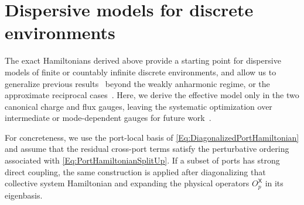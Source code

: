 \documentclass[prx,aps,twocolumn,article]{revtex4-2}
\newcommand{\msf}[1]{\mathsf{#1}}
\newcommand{\msX}{\msf{X}}
\begin{document}
\section{Dispersive models for discrete environments}
\label{Sec:SW-Models}
The exact Hamiltonians derived above provide a starting point for dispersive models of finite or countably infinite discrete environments, and allow us to generalize previous results~\cite{Solgun:2019,Labarca:2024} beyond the weakly anharmonic regime, or the approximate reciprocal cases~\cite{Khan:2024}. Here, we derive the effective model only in the two canonical charge and flux
gauges, leaving the systematic optimization over intermediate or mode-dependent gauges for future work~\cite{Roth:2019,Mehta:2022,Arwas:2023}.

For concreteness, we use the port-local basis of \cref{Eq:DiagonalizedPortHamiltonian} and assume that the residual cross-port terms satisfy the perturbative ordering associated with \cref{Eq:PortHamiltonianSplitUp}. If a subset of ports has strong direct coupling, the same construction is applied after diagonalizing that collective system Hamiltonian and expanding the physical operators $O_p^{\msX}$ in its eigenbasis.
\end{document}
